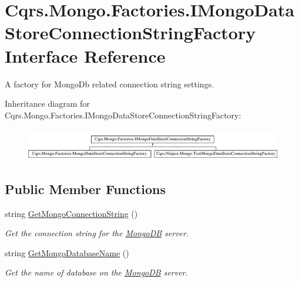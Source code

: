 \hypertarget{interfaceCqrs_1_1Mongo_1_1Factories_1_1IMongoDataStoreConnectionStringFactory}{}\section{Cqrs.\+Mongo.\+Factories.\+I\+Mongo\+Data\+Store\+Connection\+String\+Factory Interface Reference}
\label{interfaceCqrs_1_1Mongo_1_1Factories_1_1IMongoDataStoreConnectionStringFactory}


A factory for Mongo\+Db related connection string settings.  


Inheritance diagram for Cqrs.\+Mongo.\+Factories.\+I\+Mongo\+Data\+Store\+Connection\+String\+Factory\+:\begin{figure}[H]
\begin{center}
\leavevmode
\includegraphics[height=1.417722cm]{interfaceCqrs_1_1Mongo_1_1Factories_1_1IMongoDataStoreConnectionStringFactory}
\end{center}
\end{figure}
\subsection*{Public Member Functions}
\begin{DoxyCompactItemize}
\item 
string \hyperlink{interfaceCqrs_1_1Mongo_1_1Factories_1_1IMongoDataStoreConnectionStringFactory_ad8ea94d071ebedf6b137a0b99c2cc12c_ad8ea94d071ebedf6b137a0b99c2cc12c}{Get\+Mongo\+Connection\+String} ()
\begin{DoxyCompactList}\small\item\em Get the connection string for the \hyperlink{namespaceCqrs_1_1MongoDB}{Mongo\+DB} server. \end{DoxyCompactList}\item 
string \hyperlink{interfaceCqrs_1_1Mongo_1_1Factories_1_1IMongoDataStoreConnectionStringFactory_a90de27c2bf23d7f9412d55c09ab2ec8c_a90de27c2bf23d7f9412d55c09ab2ec8c}{Get\+Mongo\+Database\+Name} ()
\begin{DoxyCompactList}\small\item\em Get the name of database on the \hyperlink{namespaceCqrs_1_1MongoDB}{Mongo\+DB} server. \end{DoxyCompactList}\end{DoxyCompactItemize}


